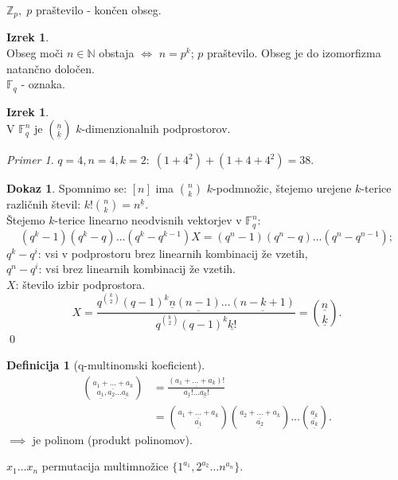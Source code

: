 \documentclass[a4paper, 12pt]{book}
\theoremstyle{definition}
\newtheorem{defn}[counter]{Definicija}
\newtheorem{theorem}[counter]{Izrek}
\newtheorem{pro}[counter]{Dokaz}
\theoremstyle{remark}
\newtheorem*{ex}{Primer}
\newcommand{\N}{\mathbb{N}}
\newcommand{\Z}{\mathbb{Z}}
\newcommand{\F}{\mathbb{F}}
\begin{document}
$\Z_p, \; p$ praštevilo - končen obseg.
\begin{theorem} \text{} \\
  Obseg moči $n \in \N$ obstaja $\iff$ $n = p^k$; $p$ praštevilo.
  Obseg je do izomorfizma natančno določen. \\
  $\F_q$ - oznaka.
\end{theorem}
\begin{theorem} \text{} \\
  V $\F_q^n$ je $\binom{\underline{n}}{\underline{k}}$ $k$-dimenzionalnih podprostorov.
\end{theorem}
\begin{ex}
  $q=4, n=4, k=2: \; (1 + 4^2) + (1 + 4 + 4^2) = 38$.
\end{ex}
\begin{pro}
  Spomnimo se: $[n]$ ima $\binom{n}{k}$ $k$-podmnožic,
  štejemo urejene $k$-terice različnih števil: $k! \binom{n}{k} = n^{\underline{k}}$. \\
  Štejemo $k$-terice linearno neodvisnih vektorjev v $\F_q^n$:
  \begin{equation*}
    (q^k-1) (q^k-q) \dots (q^k - q^{k-1}) X = (q^n-1) (q^n-q) \dots (q^n - q^{n-1});
  \end{equation*}
  $q^k - q^i$: vsi v podprostoru brez linearnih kombinacij že vzetih, \\
  $q^n - q^i$: vsi brez linearnih kombinacij že vzetih. \\
  $X$: število izbir podprostora.
  \begin{equation*}
    X = \frac{q^{\binom{k}{2}} (q-1)^k \underline{n} \underline{(n-1)} \dots \underline{(n-k+1)}}
      {q^{\binom{k}{2}} (q-1)^k \underline{k!}} = \binom{\underline{n}}{\underline{k}}.
  \end{equation*}
  \qed
\end{pro}
\begin{defn}[q-multinomski koeficient]
  \begin{align*}
    \binom{\underline{a_1 + \dots + a_k}}{\underline{a_1}, \underline{a_2} \dots \underline{a_k}}
    &= \frac{\underline{(a_1 + \dots + a_k)!}}{\underline{a_1!} \dots \underline{a_k!}} \\
    &= \binom{\underline{a_1 + \dots + a_k}}{\underline{a_1}}
      \binom{\underline{a_2 + \dots + a_k}}{\underline{a_2}} \dots \binom{\underline{a_k}}{\underline{a_k}}.
  \end{align*}
  $\implies$ je polinom (produkt polinomov).
\end{defn}
$x_1 \dots x_n$ permutacija multimnožice $\{1^{a_1}, 2^{a_2} \dots n^{a_n}\}$. \\
\end{document}
